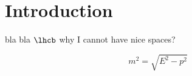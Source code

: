 
\section{Introduction}
bla 
bla 
$\lhcb$ why I cannot have nice spaces?


\[
m^2 = \sqrt{E^2-p^2}
\]